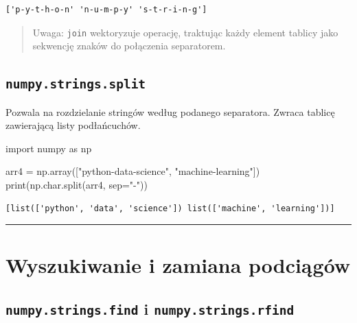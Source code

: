 \documentclass[
  polish,
  letterpaper,
  DIV=11,
  numbers=noendperiod]{scrreprt}
\newenvironment{Shaded}{\begin{snugshade}}{\end{snugshade}}
\newcommand{\BuiltInTok}[1]{\textcolor[rgb]{0.00,0.23,0.31}{#1}}
\newcommand{\ImportTok}[1]{\textcolor[rgb]{0.00,0.46,0.62}{#1}}
\newcommand{\NormalTok}[1]{\textcolor[rgb]{0.00,0.23,0.31}{#1}}
\newcommand{\OperatorTok}[1]{\textcolor[rgb]{0.37,0.37,0.37}{#1}}
\newcommand{\StringTok}[1]{\textcolor[rgb]{0.13,0.47,0.30}{#1}}
\begin{document}
\begin{verbatim}
['p-y-t-h-o-n' 'n-u-m-p-y' 's-t-r-i-n-g']
\end{verbatim}

\begin{quote}
Uwaga: \texttt{join} wektoryzuje operację, traktując każdy element
tablicy jako sekwencję znaków do połączenia separatorem.
\end{quote}

\subsection{\texorpdfstring{\texttt{numpy.strings.split}}{numpy.strings.split}}\label{numpy.strings.split}

Pozwala na rozdzielanie stringów według podanego separatora. Zwraca
tablicę zawierającą listy podłańcuchów.

\begin{Shaded}
\begin{Highlighting}[]
\ImportTok{import}\NormalTok{ numpy }\ImportTok{as}\NormalTok{ np}

\NormalTok{arr4 }\OperatorTok{=}\NormalTok{ np.array([}\StringTok{"python{-}data{-}science"}\NormalTok{, }\StringTok{"machine{-}learning"}\NormalTok{])}
\BuiltInTok{print}\NormalTok{(np.char.split(arr4, sep}\OperatorTok{=}\StringTok{"{-}"}\NormalTok{))}
\end{Highlighting}
\end{Shaded}

\begin{verbatim}
[list(['python', 'data', 'science']) list(['machine', 'learning'])]
\end{verbatim}

\begin{center}\rule{0.5\linewidth}{0.5pt}\end{center}

\section{Wyszukiwanie i zamiana
podciągów}\label{wyszukiwanie-i-zamiana-podciux105guxf3w}

\subsection{\texorpdfstring{\texttt{numpy.strings.find} i
\texttt{numpy.strings.rfind}}{numpy.strings.find i numpy.strings.rfind}}\label{numpy.strings.find-i-numpy.strings.rfind}
\end{document}
